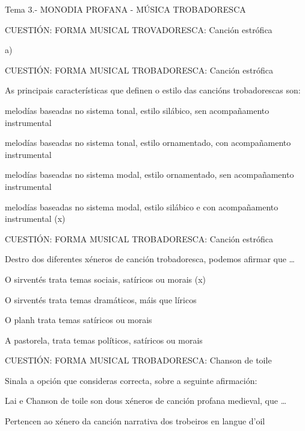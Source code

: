 Tema 3.- MONODIA PROFANA - MÚSICA TROBADORESCA

CUESTIÓN: FORMA MUSICAL TROVADORESCA: Canción estrófica

   {a)}
%




CUESTIÓN: FORMA MUSICAL TROBADORESCA: Canción estrófica

As principais características que definen o estilo das cancións trobadorescas son: 

melodías baseadas no sistema tonal, estilo silábico, sen acompañamento instrumental

melodías baseadas no sistema tonal, estilo ornamentado, con acompañamento instrumental

melodías baseadas no sistema modal, estilo ornamentado, sen acompañamento instrumental

melodías baseadas no sistema modal, estilo silábico e con acompañamento instrumental (x)



CUESTIÓN: FORMA MUSICAL TROBADORESCA: Canción estrófica

Destro dos diferentes xéneros de canción trobadoresca, podemos afirmar que …

O sirventés trata temas sociais, satíricos ou morais (x)

O sirventés trata temas dramáticos, máis que líricos

O planh trata temas satíricos ou morais  

A pastorela, trata temas políticos, satíricos ou morais



CUESTIÓN: FORMA MUSICAL TROBADORESCA: Chanson de toile

Sinala a opción que consideras correcta, sobre a seguinte afirmación: 

Lai e Chanson de toile son dous xéneros de canción profana medieval, que …

Pertencen ao xénero da canción narrativa dos trobeiros en langue d'oil

